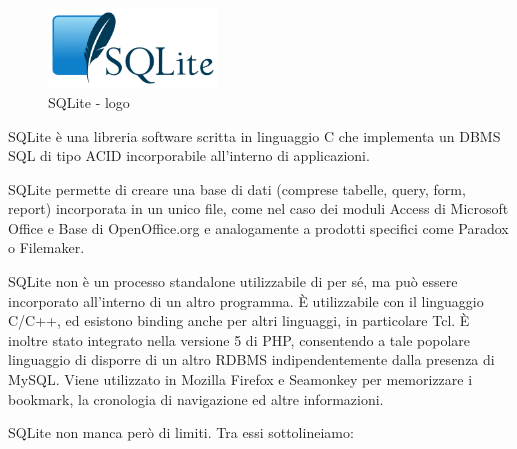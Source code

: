 \documentclass[10pt,a4paper,onecolumn]{article}
\begin{document}
\begin{figure}[h]
	\centering
	\includegraphics[width=0.4\textwidth]{img/SQLite}
	\caption{SQLite - logo}						
	\label{fig:sqllite logo}
\end{figure}

SQLite è una libreria software scritta in linguaggio C che implementa un DBMS SQL di tipo ACID incorporabile all'interno di applicazioni.

SQLite permette di creare una base di dati (comprese tabelle, query, form, report) incorporata in un unico file, come nel caso dei moduli Access di Microsoft Office e Base di OpenOffice.org e analogamente a prodotti specifici come Paradox o Filemaker.

SQLite non è un processo standalone utilizzabile di per sé, ma può essere incorporato all'interno di un altro programma. È utilizzabile con il linguaggio C/C++, ed esistono binding anche per altri linguaggi, in particolare Tcl. È inoltre stato integrato nella versione 5 di PHP, consentendo a tale popolare linguaggio di disporre di un altro RDBMS indipendentemente dalla presenza di MySQL. Viene utilizzato in Mozilla Firefox e Seamonkey per memorizzare i bookmark, la cronologia di navigazione ed altre informazioni.

SQLite non manca però di limiti. Tra essi sottolineiamo:
\end{document}
